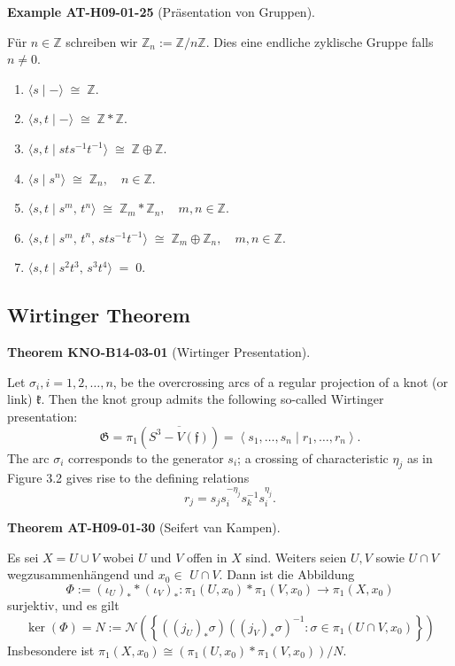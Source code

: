 \documentclass[10pt, letterpaper]{article}
\newcommand{\CustomHeading}[3]{%
  \par\medskip\noindent%
  \textbf{#1 #2} \textnormal{(#3)}.\enskip%
}
\newenvironment{THEO}[2]{\CustomHeading{Theorem}{#1}{#2}}{}
\newenvironment{EXA}[2]{\CustomHeading{Example}{#1}{#2}}{}
\begin{document}
\begin{EXA}{AT-H09-01-25}{Präsentation von Gruppen}
Für $n \in \mathbb{Z}$ schreiben wir $\mathbb{Z}_n:=\mathbb{Z} / n \mathbb{Z}$. Dies eine endliche zyklische Gruppe falls $n \neq 0$.
\begin{enumerate}[label=(\roman*)]
  \item $\langle s \mid - \rangle \;\cong\; \mathbb{Z}.$
  \item $\langle s, t \mid - \rangle \;\cong\; \mathbb{Z} * \mathbb{Z}.$
  \item $\langle s, t \mid s t s^{-1} t^{-1} \rangle \;\cong\; \mathbb{Z} \oplus \mathbb{Z}.$
  \item $\langle s \mid s^{n} \rangle \;\cong\; \mathbb{Z}_{n}, \quad n \in \mathbb{Z}.$
  \item $\langle s, t \mid s^{m},\, t^{n} \rangle \;\cong\; \mathbb{Z}_{m} * \mathbb{Z}_{n}, \quad m,n \in \mathbb{Z}.$
  \item $\langle s, t \mid s^{m},\, t^{n},\, s t s^{-1} t^{-1} \rangle 
        \;\cong\; \mathbb{Z}_{m} \oplus \mathbb{Z}_{n}, \quad m,n \in \mathbb{Z}.$
  \item $\langle s, t \mid s^{2} t^{3},\, s^{3} t^{4} \rangle \;=\; 0.$
\end{enumerate}
\end{EXA}

\subsection{Wirtinger Theorem}

\begin{THEO}{KNO-B14-03-01}{Wirtinger Presentation}
Let $\sigma_{i}, i=1,2, \ldots, n$, be the overcrossing arcs of a regular projection of a knot (or link) $\mathfrak{k}$. Then the knot group admits the following so-called Wirtinger presentation:
$$
\mathfrak{G}=\pi_{1}\left(\overline{S^{3}-V(\mathfrak{f})}\right)=\left\langle s_{1}, \ldots, s_{n} \mid r_{1}, \ldots, r_{n}\right\rangle .
$$
The arc $\sigma_{i}$ corresponds to the generator $s_{i}$; a crossing of characteristic $\eta_{j}$ as in Figure 3.2 gives rise to the defining relations
$$
r_{j}=s_{j} s_{i}^{-\eta_{j}} s_{k}^{-1} s_{i}^{\eta_{j}} .
$$
\end{THEO}

\begin{THEO}{AT-H09-01-30}{Seifert van Kampen}
Es sei $X=U \cup V$ wobei $U$ und $V$ offen in $X$ sind. Weiters seien $U, V$ sowie $U \cap V$ wegzusammenhängend und $x_0 \in$ $U \cap V$. Dann ist die Abbildung
$$\Phi:=\left(\iota_U\right)_* *\left(\iota_V\right)_*: \pi_1\left(U, x_0\right) * \pi_1\left(V, x_0\right) \rightarrow \pi_1\left(X, x_0\right)$$
surjektiv, und es gilt 
$$\operatorname{ker}(\Phi)= N:=\mathcal{N}\left(\left\{\left(\left(j_U\right)_* \sigma\right)\left(\left(j_V\right)_* \sigma\right)^{-1}: \sigma \in \pi_1\left(U \cap V, x_0\right)\right\}\right)$$ 
Insbesondere ist $\pi_1\left(X, x_0\right) \cong\left(\pi_1\left(U, x_0\right) * \pi_1\left(V, x_0\right)\right) / N$.
\end{THEO}
\end{document}
